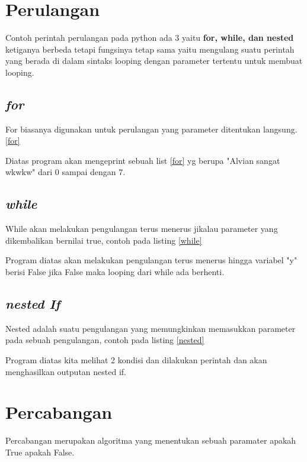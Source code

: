         \section{Perulangan}
        Contoh perintah perulangan pada python ada 3 yaitu \textbf{for, while, dan nested} ketiganya berbeda tetapi fungsinya tetap sama yaitu mengulang suatu perintah yang berada di dalam sintaks looping dengan parameter tertentu untuk membuat looping.

        \subsection{\textit{for}}
        For biasanya digunakan untuk perulangan yang parameter ditentukan langsung. \ref{for}
        
        Diatas program akan mengeprint sebuah list \ref{for} yg berupa "Alvian sangat wkwkw" dari 0 sampai dengan 7.

        \subsection{\textit{while}}
        While akan melakukan pengulangan terus menerus jikalau parameter yang dikembalikan bernilai true, contoh pada listing \ref{while}
        
        Program diatas akan melakukan pengulangan terus menerus hingga variabel "y" berisi False jika False maka looping dari while ada berhenti.

        \subsection{\textit{nested If}}
        Nested adalah suatu pengulangan yang memungkinkan memasukkan parameter pada sebuah pengulangan, contoh pada listing \ref{nested}
        
        Program diatas kita melihat 2 kondisi dan dilakukan perintah dan akan menghasilkan outputan nested if.

        \section{Percabangan}
        Percabangan merupakan algoritma yang menentukan sebuah paramater apakah True apakah False.
        
        
